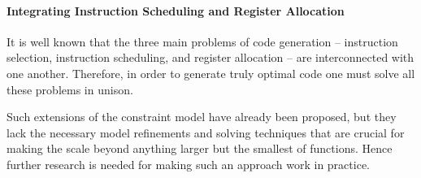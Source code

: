 \paragraph{Integrating Instruction Scheduling and Register Allocation}

It is well known that the three main problems of \gls{code generation} --
\gls{instruction selection}, \gls{instruction scheduling}, and \gls{register
  allocation} -- are interconnected with one another.
%
Therefore, in order to generate truly optimal code one must solve all these
problems in unison.

Such extensions of the \gls{constraint model} have already been proposed, but
they lack the necessary model refinements and solving techniques that are
crucial for making the  scale beyond anything larger
but the smallest of \glspl{function}.
%
Hence further research is needed for making such an approach work in practice.
